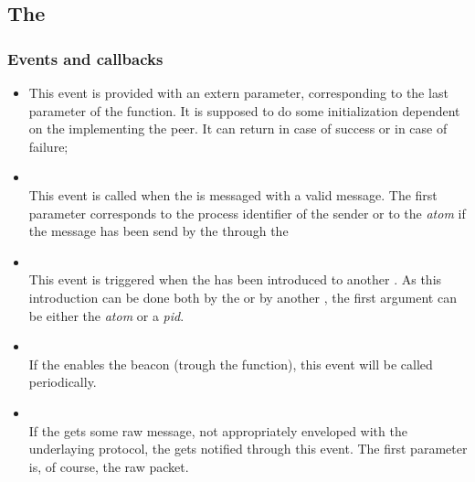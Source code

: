 \subsection{The  }

    \subsubsection{Events and callbacks}
        \begin{itemize}
        \item {}
            This event is provided with an extern parameter,
            corresponding to the last parameter of the
             function.  It is supposed to
            do some initialization dependent on the  implementing the peer.  It can return
             in case of success or  in
            case of failure;

        \item {} \\
            This event is called when the  is
            messaged with a valid message. The first parameter corresponds
            to the process identifier of the sender or to the \emph{atom}
             if the message has been send by the
             through the 

        \item {} \\
            This event is triggered when the 
            has been introduced to another . As this
            introduction can be done both by the  or by
            another , the first argument can be either the
             \emph{atom} or a \emph{pid}.

        \item {} \\
            If the  enables the beacon (trough the
             function), this event
            will be called periodically.

        \item {} \\
             If the  gets some raw message, not
            appropriately enveloped with the underlaying protocol, the
             gets notified through this event. The first
            parameter is, of course, the raw packet.

        \end{itemize}

